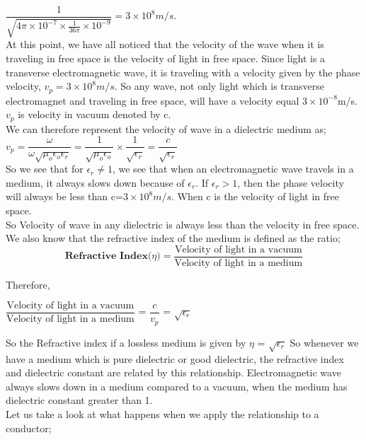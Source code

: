 		$\dfrac{1}{\sqrt{4\pi\times 10^{-7}\times \frac{1}{36\pi}\times 10^{-9}}}=3\times 10^{8}m/s.$\\
		
		At this point, we have all noticed that the velocity of the wave when it is traveling in free space is the velocity of light in free space. Since light is a transverse electromagnetic wave, it is traveling with a velocity given by the phase velocity, $v_p=3\times 10^{8}m/s$. So any wave, not only light which is transverse electromagnet and traveling in free space, will have a velocity equal $3\times 10^{-8}$m/s. $v_p$ is velocity in vacuum denoted by c.\\
		We can therefore represent the velocity of wave in a dielectric medium as;\\
		
		 $v_p=\dfrac{\omega}{\omega\sqrt{\mu_{o}\epsilon_{o}\epsilon_{r}}}=\dfrac{1}{\sqrt{\mu_{o}\epsilon_{o}}}\times \dfrac{1}{\sqrt{\epsilon_{r}}}=\dfrac{c}{\sqrt{\epsilon_{r}}}$\\
		
		So we see that for $\epsilon_{r}\neq 1$, we see that when an electromagnetic wave travels in a medium, it always slows down because of $\epsilon_{r}$. If $\epsilon_{r}>1$, then the phase velocity will always be less than c=$3\times 10^{8}m/s$. When c is the velocity of light in free space.\\
		
		So Velocity of wave in any dielectric is always less than the velocity in free space. We also know that the refractive index of the medium is defined as the ratio;\\


\begin{equation}
	\textbf{Refractive Index($\eta$)} =	\dfrac{\text{Velocity of light in a vacuum}}{\text{Velocity of light in a medium}}
\end{equation}

Therefore,
\begin{center}
$\dfrac{\text{Velocity of light in a vacuum}}{\text{Velocity of light in a medium}}$	
	= $\dfrac{c}{v_{p}}$ = $\sqrt{\epsilon_{r}}$  
\end{center}
	
	So the Refractive index if a lossless medium is given by  $\eta$ = $\sqrt{\epsilon_{r}}$ So whenever we have a medium which is pure dielectric or good dielectric, the refractive index and dielectric constant are related by this relationship. Electromagnetic wave always slows down in a medium compared to a vacuum, when the medium has dielectric constant greater than 1.\\
		Let us take a look at what happens when we apply the relationship to a conductor;\\
		

